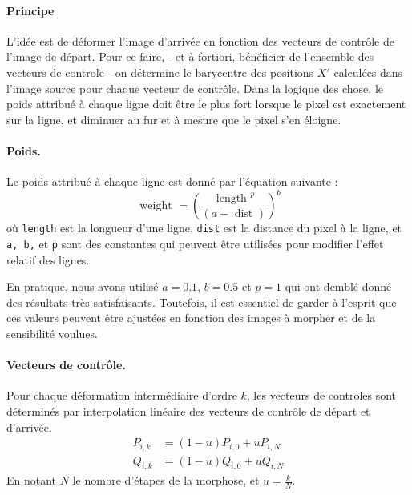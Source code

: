 \paragraph{Principe} L'idée est de déformer l'image d'arrivée en fonction des vecteurs de contrôle de l'image de départ.
Pour ce faire, - et à fortiori, bénéficier de l'ensemble des vecteurs de controle - on détermine le barycentre des positions $X'$ calculées dans l'image source
pour chaque vecteur de contrôle. Dans la logique des chose, le poids attribué à chaque ligne doit être le plus fort 
lorsque le pixel est exactement sur la ligne, et diminuer au fur et à mesure que le pixel s'en éloigne.

\paragraph{Poids.} Le poids attribué à chaque ligne est donné par l'équation suivante :
\begin{equation}
    \text { weight }=\left(\frac{\text { length }^p}{(a+\text { dist })}\right)^b
\end{equation}
où \texttt{length} est la longueur d'une ligne. \texttt{dist} est la distance du pixel à la ligne, et \texttt{a, b,} et \texttt{p} 
sont des constantes qui peuvent être utilisées pour modifier l'effet relatif des lignes.\\
\begin{codeb}
    En pratique, nous avons utilisé $a=0.1$, $b=0.5$ et $p=1$ qui ont demblé donné des résultats très satisfaisants. Toutefois, il 
    est essentiel de garder à l'esprit que ces valeurs peuvent être ajustées en fonction des images à morpher et de la sensibilité voulues.
\end{codeb}
\paragraph{Vecteurs de contrôle.} Pour chaque déformation intermédiaire d'ordre $k$, les vecteurs de controles sont déterminés par interpolation linéaire des vecteurs de contrôle de départ et d'arrivée.
\begin{equation}
    \begin{aligned}
        P_{i,k} &= (1-u)P_{i,0} + uP_{i,N}\\
        Q_{i,k} &= (1-u)Q_{i,0} + uQ_{i,N}
    \end{aligned}
\end{equation}
En notant $N$ le nombre d'étapes de la morphose, et $u=\frac{k}{N}$.
\newpage
